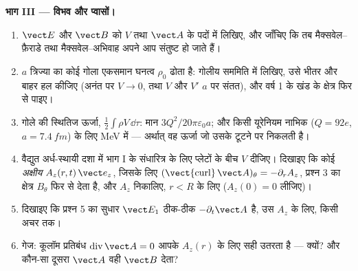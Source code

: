 \begin{problem}
\medskip
\noindent\textbf{भाग III --- विभव और प्वासों।}
\begin{enumerate}[resume]
  \item $\vect E$ और $\vect B$ को $V$ तथा $\vect A$ के पदों में लिखिए, और जाँचिए
        कि तब मैक्सवेल--फ़ैराडे तथा मैक्सवेल--अभिवाह अपने आप
        संतुष्ट हो जाते हैं।
  \item $a$ त्रिज्या का कोई गोला एकसमान घनत्व $\rho_0$ ढोता है: गोलीय
        सममिति में  लिखिए, उसे भीतर और बाहर हल कीजिए
        (अनंत पर $V \to 0$, तथा $V$ और $V'$ $a$ पर संतत), और
        वर्ष 1 के खंड के क्षेत्र फिर से पाइए।
  \item गोले की स्थितिज ऊर्जा, $\tfrac12\int\rho V\,\dd\tau$: मान
        $3Q^2/20\pi\varepsilon_0a$; और किसी यूरेनियम नाभिक ($Q = 92e$, $a =
        \qty{7.4}{fm}$) के लिए \unit{MeV} में --- अर्थात् वह ऊर्जा जो उसके टूटने पर निकलती है।
  \item वैद्युत अर्ध-स्थायी दशा में भाग I के संधारित्र के लिए
        प्लेटों के बीच $V$ दीजिए। दिखाइए कि कोई \emph{अक्षीय}
         $A_z(r, t)\,\vect e_z$, जिसके लिए $(\operatorname{\vect{curl}}
        \vect A)_\theta = -\partial_rA_z$, प्रश्न 3 का क्षेत्र $B_\theta$ फिर से देता है,
        और $A_z$ निकालिए, $r < R$ के लिए ($A_z(0) = 0$ लीजिए)।
  \item दिखाइए कि प्रश्न 5 का सुधार $\vect E_1$ ठीक-ठीक $-\partial_t\vect A$ है,
        उस $A_z$ के लिए, किसी अचर तक।
  \item गेज: कूलॉम प्रतिबंध $\operatorname{div}\vect A = 0$ आपके $A_z(r)$ के लिए
        सही उतरता है --- क्यों? और कौन-सा दूसरा $\vect A$ वही $\vect B$ देता?
\end{enumerate}


\end{problem}
